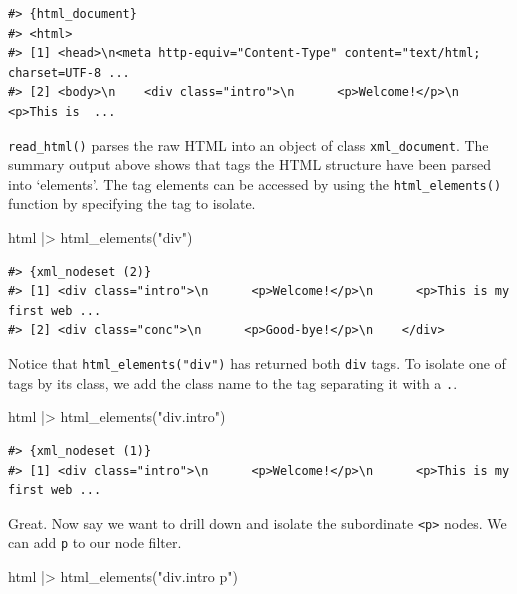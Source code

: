 \documentclass[
  letterpaper,
]{latex/krantz}
\newenvironment{Shaded}{\begin{snugshade}}{\end{snugshade}}
\newcommand{\FunctionTok}[1]{\textcolor[rgb]{0.28,0.35,0.67}{#1}}
\newcommand{\NormalTok}[1]{\textcolor[rgb]{0.00,0.23,0.31}{#1}}
\newcommand{\SpecialCharTok}[1]{\textcolor[rgb]{0.37,0.37,0.37}{#1}}
\newcommand{\StringTok}[1]{\textcolor[rgb]{0.13,0.47,0.30}{#1}}
\begin{document}
\begin{verbatim}
#> {html_document}
#> <html>
#> [1] <head>\n<meta http-equiv="Content-Type" content="text/html; charset=UTF-8 ...
#> [2] <body>\n    <div class="intro">\n      <p>Welcome!</p>\n      <p>This is  ...
\end{verbatim}

\texttt{read\_html()} parses the raw HTML into an object of class
\texttt{xml\_document}. The summary output above shows that tags the
HTML structure have been parsed into `elements'. The tag elements can be
accessed by using the \texttt{html\_elements()} function by specifying
the tag to isolate.

\begin{Shaded}
\begin{Highlighting}[]
\NormalTok{html }\SpecialCharTok{|\textgreater{}} 
  \FunctionTok{html\_elements}\NormalTok{(}\StringTok{"div"}\NormalTok{)}
\end{Highlighting}
\end{Shaded}

\begin{verbatim}
#> {xml_nodeset (2)}
#> [1] <div class="intro">\n      <p>Welcome!</p>\n      <p>This is my first web ...
#> [2] <div class="conc">\n      <p>Good-bye!</p>\n    </div>
\end{verbatim}

Notice that \texttt{html\_elements("div")} has returned both
\texttt{div} tags. To isolate one of tags by its class, we add the class
name to the tag separating it with a \texttt{.}.

\begin{Shaded}
\begin{Highlighting}[]
\NormalTok{html }\SpecialCharTok{|\textgreater{}} 
  \FunctionTok{html\_elements}\NormalTok{(}\StringTok{"div.intro"}\NormalTok{)}
\end{Highlighting}
\end{Shaded}

\begin{verbatim}
#> {xml_nodeset (1)}
#> [1] <div class="intro">\n      <p>Welcome!</p>\n      <p>This is my first web ...
\end{verbatim}

Great. Now say we want to drill down and isolate the subordinate
\texttt{\textless{}p\textgreater{}} nodes. We can add \texttt{p} to our
node filter.

\begin{Shaded}
\begin{Highlighting}[]
\NormalTok{html }\SpecialCharTok{|\textgreater{}} 
  \FunctionTok{html\_elements}\NormalTok{(}\StringTok{"div.intro p"}\NormalTok{)}
\end{Highlighting}
\end{Shaded}
\end{document}
